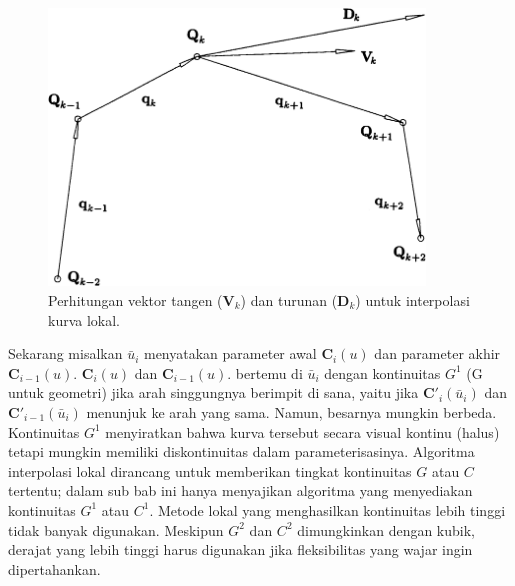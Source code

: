 \begin{figure}[H]
	\centering
	\includegraphics[keepaspectratio, width=10cm]{gambar/Interpolasi/pic10.png}
	\caption{Perhitungan vektor tangen ($\textbf{V}_k$) dan 
	turunan ($\textbf{D}_k$) untuk interpolasi kurva lokal.}
	\label{gambar:arahtangendanturunan}
\end{figure}

Sekarang misalkan $\bar{u}_i$ menyatakan parameter awal 
$\textbf{C}_{i}(u)$ dan parameter akhir $\textbf{C}_{i-1}(u)$. 
$\textbf{C}_{i}(u)$ dan $\textbf{C}_{i-1}(u)$. bertemu di 
$\bar{u}_i$ dengan kontinuitas $G^1$ (G untuk geometri) 
jika arah singgungnya berimpit di sana, yaitu jika 
$\textbf{C}'_{i}(\bar{u}_i)$ dan $\textbf{C}'_{i-1}(\bar{u}_i)$ 
menunjuk ke arah yang sama. Namun, besarnya mungkin berbeda. 
Kontinuitas $G^1$ menyiratkan bahwa kurva tersebut 
secara visual kontinu (halus) tetapi mungkin memiliki 
diskontinuitas dalam parameterisasinya. Algoritma 
interpolasi lokal dirancang untuk memberikan tingkat 
kontinuitas $G$ atau $C$ tertentu; dalam sub bab ini 
hanya menyajikan algoritma yang menyediakan 
kontinuitas $G^1$ atau $C^1$. Metode lokal yang 
menghasilkan kontinuitas lebih tinggi tidak 
banyak digunakan. Meskipun $G^2$ dan $C^2$ dimungkinkan 
dengan kubik, derajat yang lebih tinggi harus 
digunakan jika fleksibilitas yang wajar ingin dipertahankan.

